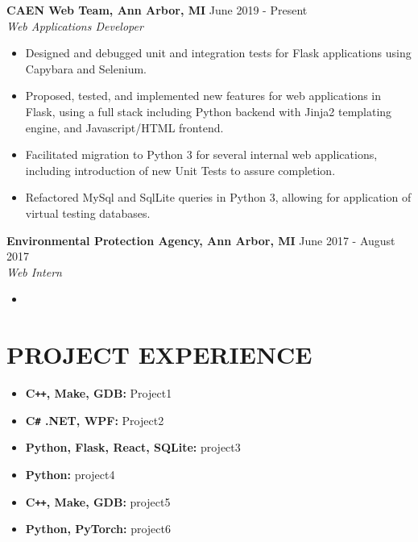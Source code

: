 \documentclass[overlapped]{res}
\begin{document}
\begin{resume}
    \textbf{CAEN Web Team, Ann Arbor, MI}
    \hfill June 2019 - Present \\
    {\sl Web Applications Developer}
    \begin{itemize}  \itemsep -2pt %
        \item Designed and debugged unit and integration tests for Flask applications using Capybara and Selenium.
        \item Proposed, tested, and implemented new features for web applications in Flask, using a full stack including Python backend with Jinja2 templating engine, and Javascript/HTML frontend.
        \item Facilitated migration to Python 3 for several internal web applications, including introduction of new Unit Tests to assure completion.
        \item Refactored MySql and SqlLite queries in Python 3, allowing for application of virtual testing databases.

    \end{itemize}

    \textbf{Environmental Protection Agency, Ann Arbor, MI}
    \hfill June 2017 - August 2017 \\
    {\sl Web Intern}
    \begin{itemize}  \itemsep -2pt %
        \item 

    \end{itemize}

    \section{PROJECT EXPERIENCE}

    \begin{itemize}[label={}]  \itemsep -2pt %
        \item \textbf{C\texttt{++}, Make, GDB:}
              Project1
        \item \textbf{C\texttt{\#} .NET, WPF:}
              Project2
        \item \textbf{Python, Flask, React, SQLite:}
              project3
        \item \textbf{Python:}
              project4
        \item \textbf{C\texttt{++}, Make, GDB:}
              project5
        \item \textbf{Python, PyTorch:}
              project6
    \end{itemize}


\end{resume}
\end{document}
